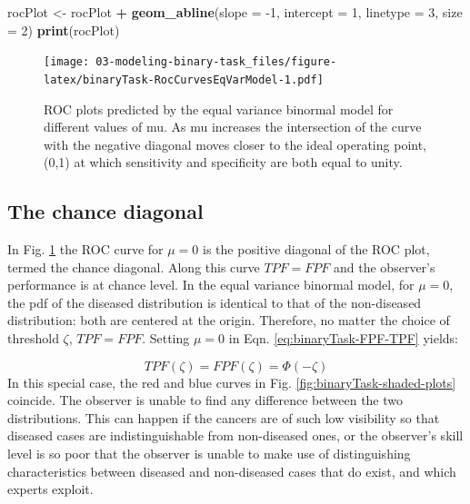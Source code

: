 \documentclass[
]{book}
\newenvironment{Shaded}{\begin{snugshade}}{\end{snugshade}}
\newcommand{\DataTypeTok}[1]{\textcolor[rgb]{0.13,0.29,0.53}{#1}}
\newcommand{\DecValTok}[1]{\textcolor[rgb]{0.00,0.00,0.81}{#1}}
\newcommand{\KeywordTok}[1]{\textcolor[rgb]{0.13,0.29,0.53}{\textbf{#1}}}
\newcommand{\NormalTok}[1]{#1}
\newcommand{\OperatorTok}[1]{\textcolor[rgb]{0.81,0.36,0.00}{\textbf{#1}}}
\newcommand{\StringTok}[1]{\textcolor[rgb]{0.31,0.60,0.02}{#1}}
\begin{document}
\begin{Shaded}
\begin{Highlighting}[]
\NormalTok{rocPlot \textless{}{-}}\StringTok{ }\NormalTok{rocPlot }\OperatorTok{+}\StringTok{ }
\StringTok{  }\KeywordTok{geom\_abline}\NormalTok{(}\DataTypeTok{slope =} \DecValTok{{-}1}\NormalTok{, }
              \DataTypeTok{intercept =} \DecValTok{1}\NormalTok{, }
              \DataTypeTok{linetype =} \DecValTok{3}\NormalTok{,}
              \DataTypeTok{size =} \DecValTok{2}\NormalTok{)}
\KeywordTok{print}\NormalTok{(rocPlot)}
\end{Highlighting}
\end{Shaded}

\begin{figure}
\centering
\texttt{[image: 03-modeling-binary-task\_files/figure-latex/binaryTask-RocCurvesEqVarModel-1.pdf]}
\caption{\label{fig:binaryTask-RocCurvesEqVarModel}ROC plots predicted by the equal variance binormal model for different values of mu. As mu increases the intersection of the curve with the negative diagonal moves closer to the ideal operating point, (0,1) at which sensitivity and specificity are both equal to unity.}
\end{figure}

\hypertarget{the-chance-diagonal}{%
\subsection{The chance diagonal}\label{the-chance-diagonal}}

In Fig. \ref{fig:binaryTask-RocCurvesEqVarModel} the ROC curve for \(\mu=0\) is the positive diagonal of the ROC plot, termed the chance diagonal. Along this curve \(TPF = FPF\) and the observer's performance is at chance level. In the equal variance binormal model, for \(\mu=0\), the pdf of the diseased distribution is identical to that of the non-diseased distribution: both are centered at the origin. Therefore, no matter the choice of threshold \(\zeta\), \(TPF = FPF\). Setting \(\mu=0\) in Eqn. \eqref{eq:binaryTask-FPF-TPF} yields:

\[TPF\left ( \zeta \right )=FPF\left ( \zeta \right )=\Phi\left ( -\zeta \right )\]
In this special case, the red and blue curves in Fig. \ref{fig:binaryTask-shaded-plots} coincide. The observer is unable to find any difference between the two distributions. This can happen if the cancers are of such low visibility so that diseased cases are indistinguishable from non-diseased ones, or the observer's skill level is so poor that the observer is unable to make use of distinguishing characteristics between diseased and non-diseased cases that do exist, and which experts exploit.
\end{document}
